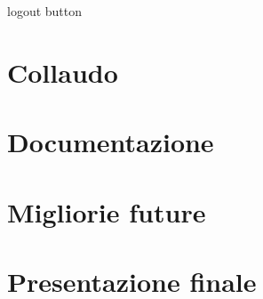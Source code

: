 logout button


\section{Collaudo}
\section{Documentazione}
\section{Migliorie future}
\section{Presentazione finale}








